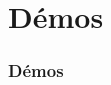 \documentclass[xcolor=pdftex,svgnames,table]{beamer}
\begin{document}
\begin{frame}
\begin{columns}
\begin{column}[t]{0.59\linewidth}
\begin{enumerate}
\begin{itemize}
      \end{itemize}
\end{enumerate}
\end{column}
\end{columns}
\end{frame}

\section{Démos}
\begin{frame}
  \frametitle{Démos}
\end{frame}
\end{document}
